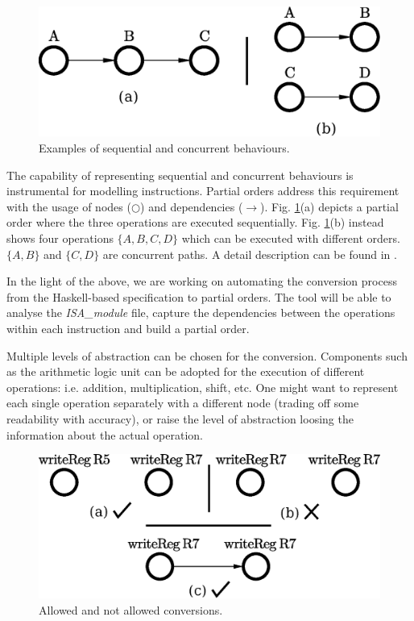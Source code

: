 \documentclass[conference]{IEEEtran}
\begin{document}
\begin{figure}[ht!]
\begin{center}
	\includegraphics[scale=0.5]{IMG/pos.eps}
	\caption{Examples of sequential and concurrent behaviours.}
	\label{fig:pos}
\end{center}
\end{figure}

The capability of representing sequential and concurrent behaviours is instrumental for
modelling instructions. Partial orders address this requirement with the usage of nodes
($\bigcirc$) and dependencies ($\rightarrow$). Fig. \ref{fig:pos}(a) depicts a partial order
where the three operations are executed sequentially. Fig. \ref{fig:pos}(b) instead shows
four operations $\lbrace A,B,C,D \rbrace$ which can be executed with different orders. 
$\lbrace A,B \rbrace$ and $\lbrace C,D \rbrace$ are concurrent paths. A detail
description can be found in \cite{andreyPhd}.

In the light of the above, we are working on automating the conversion process from the
Haskell-based specification to partial orders. The tool will be able to analyse the
\textit{ISA\_module} file, capture the dependencies between the operations within each
instruction and build a partial order. 

Multiple levels of abstraction can be chosen for the conversion. Components such as the
arithmetic logic unit can be adopted for the execution of
different operations: i.e. addition, multiplication, shift, etc. One might want to represent
each single operation separately with a different node 
(trading off some readability with accuracy), or raise the
level of abstraction loosing the information about the actual operation.

\begin{figure}[ht!]
\begin{center}
	\includegraphics[width=\linewidth]{IMG/depPO.eps}
	\caption{Allowed and not allowed conversions.}
	\label{fig:depPO}
\end{center}
\end{figure}
\end{document}
